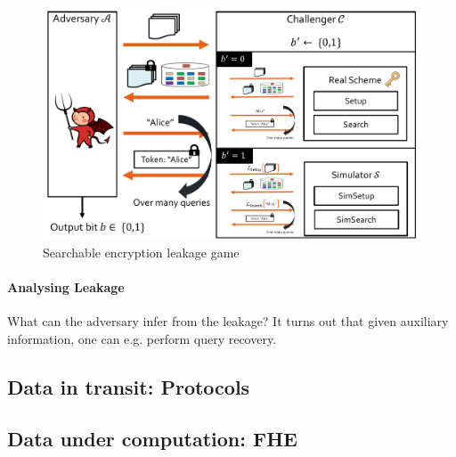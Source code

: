 \begin{figure}[h]
    \centering
	\includegraphics[scale=0.4]{images/searchable-encryption-leakage.png}
    \caption{Searchable encryption leakage game}
    \label{fig:searchable-encryption-leakage}
\end{figure}

\paragraph{Analysing Leakage}
What can the adversary infer from the leakage?
It turns out that given auxiliary information, one can e.g. perform query recovery.

\subsection{Data in transit: Protocols}


\subsection{Data under computation: FHE}

